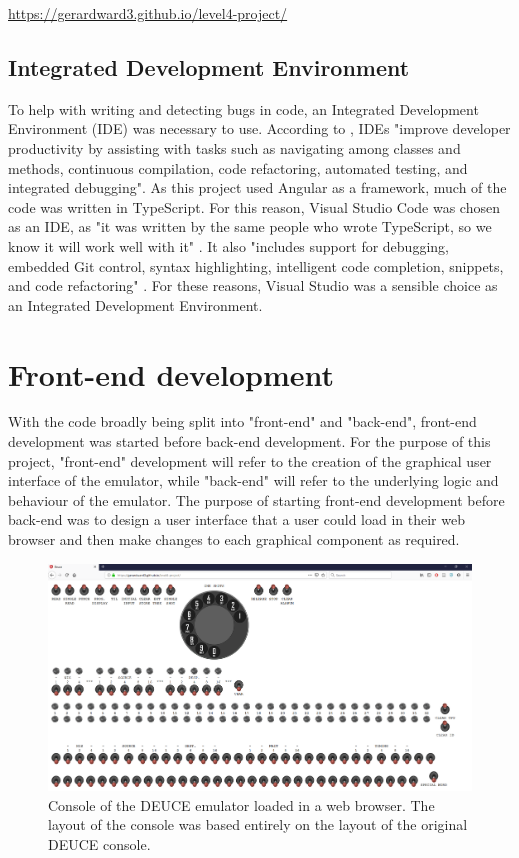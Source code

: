 \documentclass{l4proj}
\begin{document}
 \url{https://gerardward3.github.io/level4-project/}
 
\subsection{Integrated Development Environment}
To help with writing and detecting bugs in code, an Integrated Development Environment (IDE) was necessary to use. According to \citet{ide15}, IDEs "improve developer productivity by assisting with tasks such as navigating among classes and methods, continuous compilation, code refactoring, automated testing, and integrated debugging". As this project used Angular as a framework, much of the code was written in TypeScript. For this reason, Visual Studio Code was chosen as an IDE, as "it was written by the same people who wrote TypeScript, so we know it will work well with it" \citep{visualstudio18}. It also "includes support for debugging, embedded Git control, syntax highlighting, intelligent code completion, snippets, and code refactoring" \citep{visualstudio18}. For these reasons, Visual Studio was a sensible choice as an Integrated Development Environment.

\section{Front-end development}
With the code broadly being split into "front-end" and "back-end", front-end development was started before back-end development. For the purpose of this project, "front-end" development will refer to the creation of the graphical user interface of the emulator, while "back-end" will refer to the underlying logic and behaviour of the emulator. The purpose of starting front-end development before back-end was to design a user interface that a user could load in their web browser and then make changes to each graphical component as required. 

\begin{figure}[h]
	\centering
	\includegraphics[width=\linewidth]{images/deuce-emu}
	\caption{Console of the DEUCE emulator loaded in a web browser. The layout of the console was based entirely on the layout of the original DEUCE console.}
	\label{fig:deuce-emu}
\end{figure}
\end{document}
